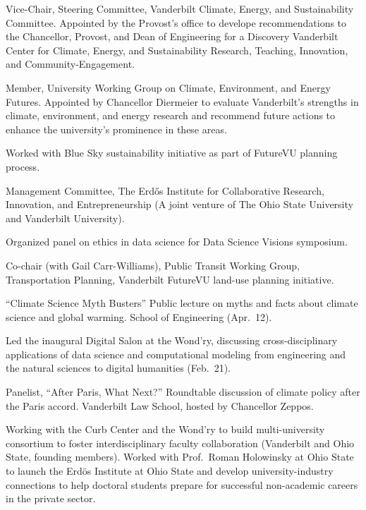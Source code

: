 \item[2023] Vice-Chair, Steering Committee, Vanderbilt Climate, Energy, and Sustainability
  Committee. Appointed by the Provost's office to develope recommendations to the Chancellor, Provost, and Dean of Engineering for a Discovery Vanderbilt Center for 
  Climate, Energy, and Sustainability Research, Teaching, Innovation, and
  Community-Engagement.
\item[2021--2022] Member, University Working Group on Climate, Environment,
  and Energy Futures.
  Appointed by Chancellor Diermeier to evaluate Vanderbilt's strengths in climate,
  environment, and energy research and recommend future actions to enhance
  the university's prominence in these areas.
\item[2018--2019] Worked with Blue Sky sustainability initiative as part of
  FutureVU planning process.
\item[2017--2019] Management Committee, The Erd\H{o}s Institute for
  Collaborative Research, Innovation, and Entrepreneurship (A joint venture of
  The Ohio State University and Vanderbilt University).
\item[2018] Organized panel on ethics in data science for Data Science Visions
symposium.
\item[2017] Co-chair (with Gail Carr-Williams), Public Transit Working Group,
  Transportation Planning, Vanderbilt FutureVU land-use planning initiative.
\item[2017] ``Climate Science Myth Busters'' Public lecture on myths and facts
  about climate science and global warming. School of Engineering (Apr.~12).
\item[2017] Led the inaugural Digital Salon at the Wond'ry, discussing
  cross-disciplinary applications of data science and computational modeling
  from engineering and the natural sciences to digital humanities (Feb.~21).
\item[2016] Panelist, ``After Paris, What Next?''  Roundtable discussion of
  climate policy after the Paris accord. Vanderbilt Law School, hosted by
  Chancellor Zeppos.
\item[2015--2017] Working with the Curb Center and the Wond'ry to build
  multi-university consortium to foster interdisciplinary faculty collaboration
  (Vanderbilt and Ohio State, founding members).  Worked with Prof.\ Roman
  Holowinsky at Ohio State to launch the Erd\"os Institute at Ohio State and
  develop university-industry connections to help doctoral students prepare for
  successful non-academic careers in the private sector.
